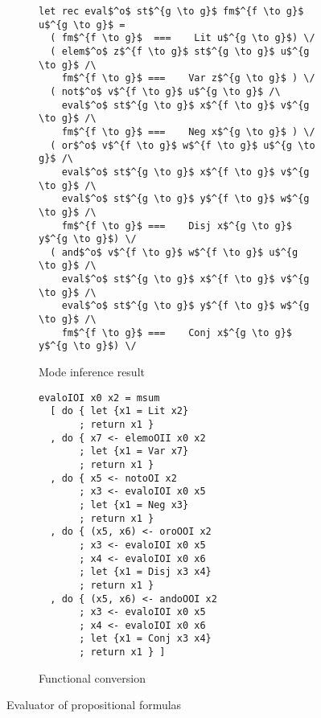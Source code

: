 \begin{figure*}[h]
  \centering
  \begin{subfigure}[b]{0.45\textwidth}
    \begin{lstlisting}[frame=tb]
let rec eval$^o$ st$^{g \to g}$ fm$^{f \to g}$ u$^{g \to g}$ =
  ( fm$^{f \to g}$  ===    Lit u$^{g \to g}$) \/
  ( elem$^o$ z$^{f \to g}$ st$^{g \to g}$ u$^{g \to g}$ /\
    fm$^{f \to g}$ ===    Var z$^{g \to g}$ ) \/
  ( not$^o$ v$^{f \to g}$ u$^{g \to g}$ /\
    eval$^o$ st$^{g \to g}$ x$^{f \to g}$ v$^{g \to g}$ /\
    fm$^{f \to g}$ ===    Neg x$^{g \to g}$ ) \/
  ( or$^o$ v$^{f \to g}$ w$^{f \to g}$ u$^{g \to g}$ /\
    eval$^o$ st$^{g \to g}$ x$^{f \to g}$ v$^{g \to g}$ /\
    eval$^o$ st$^{g \to g}$ y$^{f \to g}$ w$^{g \to g}$ /\
    fm$^{f \to g}$ ===    Disj x$^{g \to g}$ y$^{g \to g}$) \/
  ( and$^o$ v$^{f \to g}$ w$^{f \to g}$ u$^{g \to g}$ /\
    eval$^o$ st$^{g \to g}$ x$^{f \to g}$ v$^{g \to g}$ /\
    eval$^o$ st$^{g \to g}$ y$^{f \to g}$ w$^{g \to g}$ /\
    fm$^{f \to g}$ ===    Conj x$^{g \to g}$ y$^{g \to g}$) \/
    \end{lstlisting}
    \caption{Mode inference result}
    \label{fig:prop_modded}
  \end{subfigure}
\hfill
  \begin{subfigure}[b]{0.45\textwidth}
    \begin{lstlisting}[frame=tb]
evaloIOI x0 x2 = msum
  [ do { let {x1 = Lit x2}
       ; return x1 }
  , do { x7 <- elemoOII x0 x2
       ; let {x1 = Var x7}
       ; return x1 }
  , do { x5 <- notoOI x2
       ; x3 <- evaloIOI x0 x5
       ; let {x1 = Neg x3}
       ; return x1 }
  , do { (x5, x6) <- oroOOI x2
       ; x3 <- evaloIOI x0 x5
       ; x4 <- evaloIOI x0 x6
       ; let {x1 = Disj x3 x4}
       ; return x1 }
  , do { (x5, x6) <- andoOOI x2
       ; x3 <- evaloIOI x0 x5
       ; x4 <- evaloIOI x0 x6
       ; let {x1 = Conj x3 x4}
       ; return x1 } ]
    \end{lstlisting}
    \caption{Functional conversion}
    \label{fig:prop_hsk}
  \end{subfigure}
  \caption{Evaluator of propositional formulas}
  \label{fig:prop}
\end{figure*}

